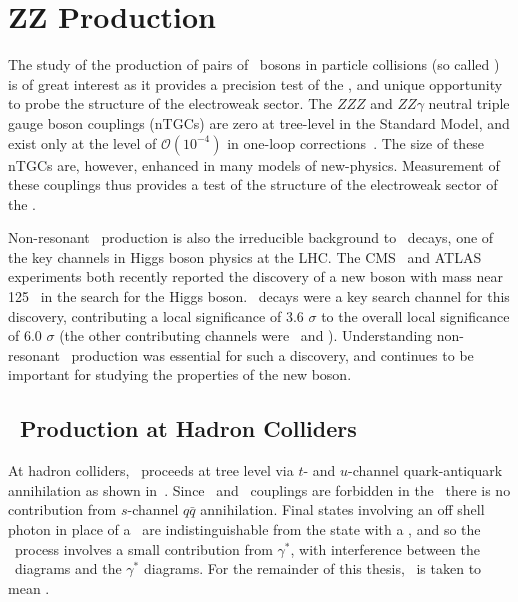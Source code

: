 \graphicspath{{Chapters/TheoryZZProduction/Figures/}}
\chapter{ZZ Production}
\label{chap:TheoryZZProduction}


The study of the production of pairs of \Z\ bosons in particle collisions (so
called ) is of great interest
as it provides a precision test of the \sm, and unique opportunity to
probe the structure of the electroweak sector. 
The $ZZZ$ and $ZZ\gamma$ neutral triple gauge boson
couplings (nTGCs) are zero at tree-level in the Standard Model, and exist only
at the level of  $\mathcal{O}(10^{-4})$ in one-loop
corrections~\cite{Gounaris:2000dn}. The size of these nTGCs are,
however, enhanced in many models of new-physics. Measurement of these couplings
thus provides a test of the structure of the electroweak sector of the \sm.

Non-resonant \ZZ\ production is also the
irreducible background to \HZZ\ decays, one of the key channels in Higgs boson physics
at the LHC. The CMS~\cite{CMS_Higgs:2012gu} and ATLAS~\cite{ATLAS_Higgs:2012gk}
experiments both recently reported the discovery of a new boson with mass near
125 \gev\ in the search for the Higgs boson. \HZZ\ decays were a key
search channel for this discovery, contributing a local significance of 3.6
$\sigma$ to the overall local significance of 6.0 $\sigma$ (the other
contributing channels were \Hgg\ and \HWW). Understanding non-resonant \ZZ\
production was essential for such a discovery, and continues to be important for
studying the properties of the new boson.

\section{\ZZ\ Production at Hadron Colliders}

At hadron colliders, \qqZZ\ proceeds at tree level via $t$- and $u$-channel
quark-antiquark annihilation as shown in~\fig{theoryzz-fd-qqZZ}. Since \ZZZ\ and
\ZZg\ couplings are forbidden in the \sm\ there is no contribution from
$s$-channel $q\bar{q}$ annihilation. Final states involving an off shell photon
in place of a \Z\ are indistinguishable from the state with a \Z, and so the
\qqZZ\ process involves a small
contribution from $\gamma^{*}$, with interference between the \Z\ diagrams and
the $\gamma^{*}$ diagrams. For the remainder of this thesis, \Z\ is taken to
mean \Zorgv.

